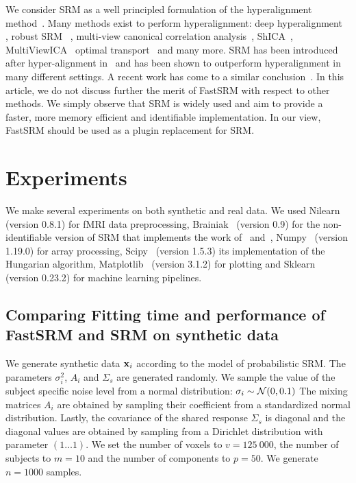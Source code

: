 \documentclass{article}
\newcommand{\bt}[1]{\todo[color=orange, inline=True]{BT: #1}}
\begin{document}
We consider SRM as a well principled formulation of the hyperalignment
method~\cite{haxby2011common}.
%
Many methods exist to perform hyperalignment: deep
hyperalignment~\cite{yousefnezhad2017deep} , robust
SRM~\cite{turek2018capturing} , multi-view canonical correlation
analysis~\cite{li2009joint}, ShICA~\cite{richard2021model},
MultiViewICA~\cite{richard2020modeling} optimal
transport~\cite{bazeille2019local} and many more.
%
SRM has been introduced after hyper-alignment in~\cite{chen2015reduced} and has been shown to outperform hyperalignment in many different settings. A recent work has come to a similar conclusion~\cite{bazeille2021empirical}. In this article, we do not discuss further the merit of FastSRM with respect to other methods. We simply observe that SRM is widely used and aim to provide
a faster, more memory efficient and identifiable implementation.  In
our view, FastSRM should be used as a plugin replacement for SRM.


\section{Experiments}
We make several experiments on both synthetic and real data.
%
We used Nilearn~\cite{abraham2014machine} (version 0.8.1) for fMRI data preprocessing,
Brainiak~\cite{kumar2020brainiak2} (version 0.9) for the non-identifiable version of SRM that
implements the work of~\cite{chen2015reduced} and~\cite{anderson2016enabling},
Numpy~\cite{harris2020array} (version 1.19.0) for
array processing, Scipy~\cite{2020SciPy-NMeth} (version 1.5.3) its implementation of the
Hungarian algorithm, Matplotlib~\cite{hunter2007matplotlib} (version 3.1.2) for plotting and
Sklearn~\cite{pedregosa2011scikit} (version 0.23.2) for machine learning pipelines.

\subsection{Comparing Fitting time and performance of FastSRM and
  SRM on synthetic data}
We generate synthetic data $\mathbf{x}_i$ according to the model of probabilistic SRM.
%
The parameters $\sigma_i^2$, $A_i$ and $\Sigma_s$ are generated randomly.
%
We sample the value of the subject specific noise level from a normal
distribution: $\sigma_i \sim \mathcal{N}(0, 0.1)$
%
The mixing matrices $A_i$
are obtained by sampling their coefficient from a standardized normal
distribution.
%
Lastly, the covariance of the shared response $\Sigma_s$ is diagonal and the
diagonal values are obtained by sampling from a Dirichlet distribution with
parameter $(1 \dots 1)$.
%
We set the number of voxels to $v=125~000$, the number of subjects to $m=10$ and
the number of components to $p=50$.
%
We generate $n=1000$ samples.
%
\end{document}
